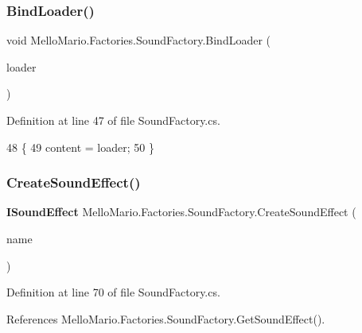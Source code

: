 \subsubsection{Bind\+Loader()\hspace{0.1cm}{\footnotesize\ttfamily [2/2]}}
{\footnotesize\ttfamily void Mello\+Mario.\+Factories.\+Sound\+Factory.\+Bind\+Loader (\begin{DoxyParamCaption}\item[{Content\+Manager}]{loader }\end{DoxyParamCaption})}



Definition at line 47 of file Sound\+Factory.\+cs.


\begin{DoxyCode}
48         \{
49             content = loader;
50         \}
\end{DoxyCode}
\mbox{\label{classMelloMario_1_1Factories_1_1SoundFactory_a4dd2e3b58eeabb4fb2db1de68538b991}} 
\subsubsection{Create\+Sound\+Effect()}
{\footnotesize\ttfamily \textbf{ I\+Sound\+Effect} Mello\+Mario.\+Factories.\+Sound\+Factory.\+Create\+Sound\+Effect (\begin{DoxyParamCaption}\item[{string}]{name }\end{DoxyParamCaption})}



Definition at line 70 of file Sound\+Factory.\+cs.



References Mello\+Mario.\+Factories.\+Sound\+Factory.\+Get\+Sound\+Effect().


